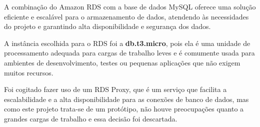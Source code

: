 
A combinação do Amazon RDS com a base de dados MySQL oferece uma solução eficiente e escalável para o armazenamento de dados, atendendo às necessidades do projeto e garantindo alta disponibilidade e segurança dos dados.









A instância escolhida para o RDS foi a \textbf{db.t3.micro}, pois ela é uma unidade de processamento adequada para cargas de trabalho leves e é comumente usada para ambientes de desenvolvimento, testes ou pequenas aplicações que não exigem muitos recursos.

Foi cogitado fazer uso de um RDS Proxy, que é um serviço que facilita a escalabilidade e a alta disponibilidade para as conexões de banco de dados, mas como este projeto trata-se de um protótipo, não houve preocupações quanto a grandes cargas de trabalho e essa decisão foi descartada. 



